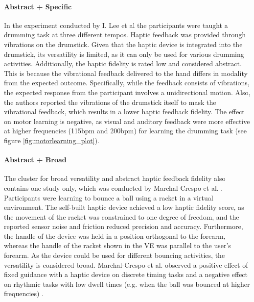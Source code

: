 \paragraph{Abstract + Specific} \label{sec:abstractspecific}
In the experiment conducted by I. Lee et al \cite{Lee2012} the participants were taught a drumming task at three different tempos. Haptic feedback was provided through vibrations on the drumstick. Given that the haptic device is integrated into the drumstick, its versatility is limited, as it can only be used for various drumming activities. Additionally, the haptic fidelity is rated low and considered abstract. This is because the vibrational feedback delivered to the hand differs in modality from the expected outcome. Specifically, while the feedback consists of vibrations, the expected response from the participant involves a unidirectional motion. Also, the authors reported the vibrations of the drumstick itself to mask the vibrational feedback, which results in a lower haptic feedback fidelity. The effect on motor learning is negative, as visual and auditory feedback were more effective at higher frequencies (115bpm and 200bpm) for learning the drumming task (see figure \ref{fig:motorlearning_plot}).

\paragraph{Abstract + Broad} \label{sec:abstractbroad}
The cluster for broad versatility and abstract haptic feedback fidelity also contains one study only, which was conducted by Marchal-Crespo et al. \cite{Marchal-Crespo2009ReviewInjury}. Participants were learning to bounce a ball using a racket in a virtual environment. The self-built haptic device achieved a low haptic fidelity score, as the movement of the racket was constrained to one degree of freedom, and the reported sensor noise and friction reduced precision and accuracy. Furthermore, the handle of the device was held in a position orthogonal to the forearm, whereas the handle of the racket shown in the VE was parallel to the user's forearm. As the device could be used for different bouncing activities, the versatility is considered broad. Marchal-Crespo et al. observed a positive effect of fixed guidance with a haptic device on discrete timing tasks and a negative effect on rhythmic tasks with low dwell times (e.g. when the ball was bounced at higher frequencies) \cite{Crespo2015}.

